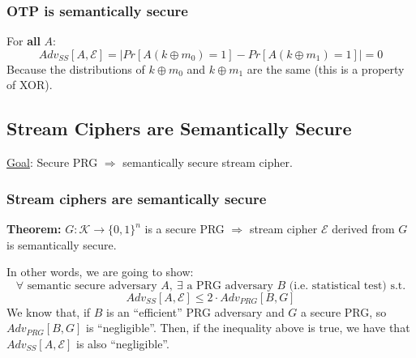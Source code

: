 \documentclass[12pt]{book}
\newcommand{\Thm}{\textbf{Theorem:} }
\begin{document}
\subsubsection{OTP is semantically secure}
\begin{center}
\end{center}For \textbf{all} $A$:
$$Adv_{SS}[A,\mathcal{E}]=\Big|Pr[A(k\oplus m_{0})=1]-Pr[A(k\oplus m_{1})=1]\Big|=0$$Because the distributions of $k\oplus m_{0}$ and $k\oplus m_{1}$ are the same (this is a property of XOR).

\subsection{Stream Ciphers are Semantically Secure}
\underline{Goal}: Secure PRG $\Rightarrow$ semantically secure stream cipher.
\subsubsection{Stream ciphers are semantically secure}
\Thm $G:\mathcal{K}\rightarrow\{0,1\}^{n}$ is a secure PRG $\Rightarrow$ stream cipher $\mathcal{E}$ derived from $G$ is semantically secure.

In other words, we are going to show:
$$\forall \text{ semantic secure adversary }A,\ \exists\text{ a PRG adversary }B\text{ (i.e. statistical test) s.t.}$$
$$Adv_{SS}[A,\mathcal{E}]\leq2\cdot Adv_{PRG}[B,G]$$
We know that, if $B$ is an ``efficient'' PRG adversary and $G$ a secure PRG, so $Adv_{PRG}[B,G]$ is ``negligible''. Then, if the inequality above is true, we have that $Adv_{SS}[A,\mathcal{E}]$ is also ``negligible''.
\end{document}
